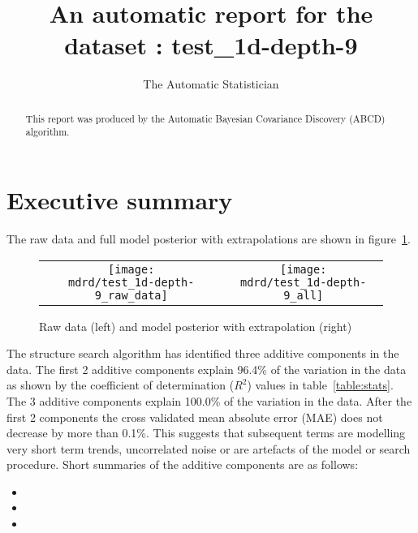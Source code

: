 \documentclass{article} %
\title{An automatic report for the dataset : test_1d-depth-9}
\author{
The Automatic Statistician
}
\begin{document}
\allowdisplaybreaks

\maketitle

\begin{abstract}
This report was produced by the Automatic Bayesian Covariance Discovery (ABCD) algorithm.
\end{abstract}

\section{Executive summary}

The raw data and full model posterior with extrapolations are shown in figure~\ref{fig:rawandfit}.

\begin{figure}[H]
\newcommand{\wmgd}{0.5\columnwidth}
\newcommand{\hmgd}{3.0cm}
\newcommand{\mdrd}{test_1d-depth-9}
\newcommand{\mbm}{\hspace{-0.3cm}}
\begin{tabular}{cc}
\mbm \texttt{[image: \\mdrd/test\_1d-depth-9\_raw\_data]} & \texttt{[image: \\mdrd/test\_1d-depth-9\_all]}
\end{tabular}
\caption{Raw data (left) and model posterior with extrapolation (right)}
\label{fig:rawandfit}
\end{figure}

The structure search algorithm has identified three additive components in the data.
The  first 2 additive components explain 96.4\% of the variation in the data as shown by the coefficient of determination ($R^2$) values in table~\ref{table:stats}.
The 3 additive components explain 100.0\% of the variation in the data.
After the first 2 components the cross validated mean absolute error (MAE) does not decrease by more than 0.1\%.
This suggests that subsequent terms are modelling very short term trends, uncorrelated noise or are artefacts of the model or search procedure.
Short summaries of the additive components are as follows:
\begin{itemize}

  \item  

  \item  

  \item  

\end{itemize}
\end{document}
